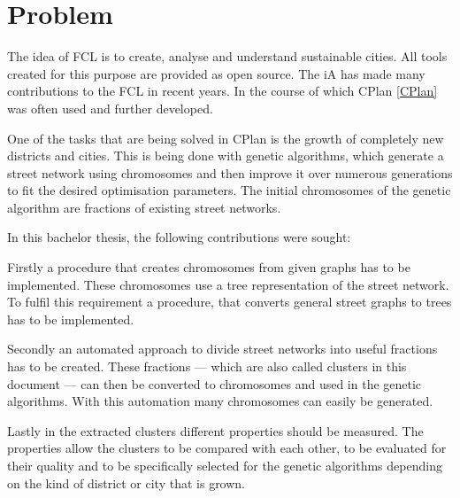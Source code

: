 \chapter{Problem}
The idea of \gls{FCL} is to create, analyse and understand sustainable cities. All tools created for this purpose are provided as open source. The \gls{iA} has made many contributions to the \gls{FCL} in recent years. In the course of which CPlan \ref{CPlan} was often used and further developed.

One of the tasks that are being solved in CPlan is the growth of completely new districts and cities. This is being done with genetic algorithms, which generate a street network using chromosomes and then improve it over numerous generations to fit the desired optimisation parameters. The initial chromosomes of the genetic algorithm are fractions of existing street networks.

In this bachelor thesis, the following contributions were sought:

Firstly a procedure that creates chromosomes from given graphs has to be implemented. These chromosomes use a tree representation of the street network. To fulfil this requirement a procedure, that converts general street graphs to trees has to be implemented.

Secondly an automated approach to divide street networks into useful fractions has to be created. These fractions --- which are also called clusters in this document --- can then be converted to chromosomes and used in the genetic algorithms. With this automation many chromosomes can easily be generated.

Lastly in the extracted clusters different properties should be measured. The properties allow the clusters to be compared with each other, to be evaluated for their quality and to be specifically selected for the genetic algorithms depending on the kind of district or city that is grown.
